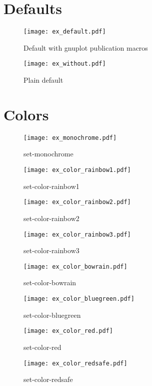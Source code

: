 \documentclass[twocolumn,floatfix]{revtex4-1}
\begin{document}
\section{Defaults}

\begin{figure}[h]
\centering
\texttt{[image: ex\_default.pdf]}
\caption{Default with gnuplot publication macros}
\end{figure}

\begin{figure}[h]
\texttt{[image: ex\_without.pdf]}
\caption{Plain default}
\end{figure}

\newpage
\section{Colors}

\begin{figure}[h]
\centering
\texttt{[image: ex\_monochrome.pdf]}
\caption{set-monochrome}
\end{figure}

\begin{figure}[h]
\centering
\texttt{[image: ex\_color\_rainbow1.pdf]}
\caption{set-color-rainbow1}
\end{figure}

\begin{figure}[h]
\centering
\texttt{[image: ex\_color\_rainbow2.pdf]}
\caption{set-color-rainbow2}
\end{figure}

\begin{figure}[h]
\centering
\texttt{[image: ex\_color\_rainbow3.pdf]}
\caption{set-color-rainbow3}
\end{figure}

\begin{figure}[h]
\centering
\texttt{[image: ex\_color\_bowrain.pdf]}
\caption{set-color-bowrain}
\end{figure}

\begin{figure}[h]
\centering
\texttt{[image: ex\_color\_bluegreen.pdf]}
\caption{set-color-bluegreen}
\end{figure}

\begin{figure}[h]
\centering
\texttt{[image: ex\_color\_red.pdf]}
\caption{set-color-red}
\end{figure}

\begin{figure}[h]
\centering
\texttt{[image: ex\_color\_redsafe.pdf]}
\caption{set-color-redsafe}
\end{figure}
\end{document}
